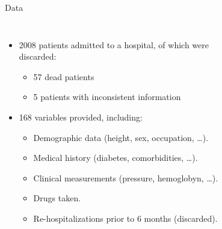 \documentclass[aspectratio=169,xcolor=dvipsnames]{beamer}
\begin{document}
\begin{frame}{Data}
    \begin{columns}[t]
        \begin{itemize}
            \item 2008 patients admitted to a hospital, of which were discarded:
            \begin{itemize}
                \item 57 dead patients
                \item 5 patients with inconsistent information
            \end{itemize}
            
            \item 168 variables provided, including:
            \begin{itemize}
                \item Demographic data (height, sex, occupation, \ldots).
                \item Medical history (diabetes, comorbidities, \ldots).
                \item Clinical measurements (pressure, hemoglobyn, \ldots).
                \item Drugs taken.
                \item Re-hospitalizations prior to 6 months (discarded).
            \end{itemize}
        \end{itemize}
        \pause

        \begin{figure}
        \centering


\end{figure}
\end{columns}
\end{frame}
\end{document}
